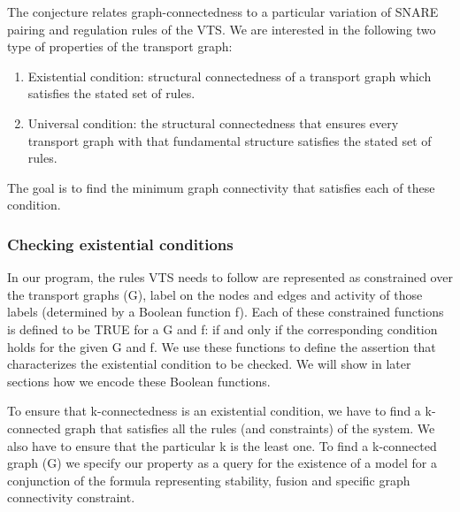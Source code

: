 The conjecture relates graph-connectedness to a particular variation of SNARE pairing and regulation rules of the VTS.
%
We are interested in the following two type of properties of the transport graph:

\begin{enumerate}
\item Existential condition:
structural connectedness of a transport graph which satisfies the stated set of rules. 



\item Universal condition: 
the structural connectedness that ensures every transport graph with that fundamental structure satisfies the stated set of rules. 
\end{enumerate}

The goal is to find the minimum graph connectivity that satisfies each of these condition.


\subsubsection{Checking existential conditions} 
In our program, the rules VTS needs to follow 
%
%
are represented as constrained over the transport graphs (G), label on the nodes and edges and activity of those labels (determined by a Boolean function f). 
%
Each of these constrained functions is defined to be TRUE for a G and f: if and only if the corresponding condition holds for the given G and f. 
%
We use these functions to define the assertion that characterizes the existential condition to be checked. 
%
We will show in later sections how we encode these Boolean functions. 


To ensure that k-connectedness is an existential condition, we have to find a k-connected graph that satisfies all the rules (and constraints) of the system. 
%
We also have to ensure that the particular k is the least one. 
%
%
To find a k-connected graph (G) we specify our property as a query for the existence of a model for a conjunction of the formula representing stability, fusion and specific graph connectivity constraint. 
%

